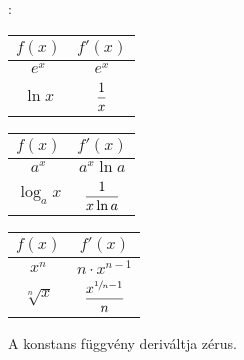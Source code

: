 \documentclass[a4paper, 12pt]{scrartcl}
\begin{document}
\begin{blueBox}
  :

  \begin{minipage}{.3\textwidth}
    \def\arraystretch{1.5}\centering
    \begin{tabular}{c c}
      $f(x)$   & $f'(x)$                                                   \\ \toprule
      $e^x$    & $e^x$                                                     \\[2mm]
      $\ln x $ & $\dfrac{1}{x} \vphantom{\dfrac{x^{\sfrac{1}{n} - 1}}{n}}$ \\ \bottomrule
    \end{tabular}
  \end{minipage}\hfill\begin{minipage}{.3\textwidth}
    \def\arraystretch{1.5}\centering
    \begin{tabular}{c c}
      $f(x)$     & $f'(x)$                                                         \\ \toprule
      $a^x$      & $a^x \ln a$                                                     \\[2mm]
      $\log_a x$ & $\dfrac{1}{x \ln a} \vphantom{\dfrac{x^{\sfrac{1}{n} - 1}}{n}}$ \\ \bottomrule
    \end{tabular}
  \end{minipage}\hfill\begin{minipage}{.3\textwidth}
    \def\arraystretch{1.5}\centering
    \begin{tabular}{c c}
      $f(x)$        & $f'(x)$                           \\ \toprule
      $x^n$         & $n \cdot x^{n - 1}$               \\[2mm]
      $\sqrt[n]{x}$ & $\dfrac{x^{\sfrac{1}{n} - 1}}{n}$ \\ \bottomrule
    \end{tabular}
  \end{minipage}
\end{blueBox}

\begin{note}
  A konstans függvény deriváltja zérus.
\end{note}
\end{document}
